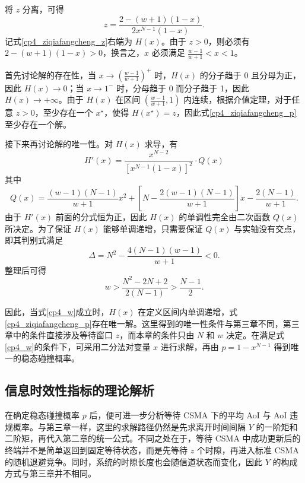 将 $z$ 分离，可得
\begin{equation}\label{cp4_ziqiafangcheng_z}
    z=\frac{2-(w+1)(1-x)}{2x^{N-1}(1-x)}.
\end{equation}
记式\eqref{cp4_ziqiafangcheng_z}右端为 $H(x)$。由于 $z>0$，则必须有 $2-(w+1)(1-x)>0$，换言之，$x$ 必须满足 $\frac{w-1}{w+1}<x<1$。

首先讨论解的存在性，当 $x\to \left(\frac{w-1}{w+1}\right)^+$ 时，$H(x)$ 的分子趋于 0 且分母为正，因此 $H(x)\to 0$；当 $x\to 1^-$ 时，分母趋于 0 而分子趋于 1，因此 $H(x)\to +\infty$。由于 $H(x)$ 在区间 $\left(\frac{w-1}{w+1},1\right)$ 内连续，根据介值定理，对于任意 $z>0$，至少存在一个 $x^\star$，使得 $H(x^\star)=z$，因此式\eqref{cp4_ziqiafangcheng_p}至少存在一个解。

接下来再讨论解的唯一性。对 $H(x)$ 求导，有
\begin{equation}
    H'(x) = \frac{x^{N-2}}{\left[x^{N-1}(1-x)\right]^2} \cdot Q(x)
\end{equation}
其中
\begin{equation}
    Q(x) = \frac{(w-1)(N-1)}{w+1}x^2 + \left[N - \frac{2(w-1)(N-1)}{w+1}\right]x - \frac{2(N-1)}{w+1}.
\end{equation}
由于 $H'(x)$ 前面的分式恒为正，因此 $H(x)$ 的单调性完全由二次函数 $Q(x)$ 所决定。为了保证 $H(x)$ 能够单调递增，只需要保证 $Q(x)$ 与实轴没有交点，即其判别式满足
\begin{equation}
    \Delta = N^2 - \frac{4(N-1)(w-1)}{w+1}<0.
\end{equation}
整理后可得
\begin{equation}\label{cp4_w}
    w>\frac{N^2-2N+2}{2(N-1)}>\frac{N-1}{2}.
\end{equation}

因此，当式\eqref{cp4_w}成立时，$H(x)$ 在定义区间内单调递增，式\eqref{cp4_ziqiafangcheng_p}存在唯一解。这里得到的唯一性条件与第三章不同，第三章中的条件直接涉及等待窗口 $z$，而本章的条件只由 $N$ 和 $w$ 决定。在满足式\eqref{cp4_w}的条件下，可采用二分法对变量 $x$ 进行求解，再由 $p=1-x^{N-1}$ 得到唯一的稳态碰撞概率。

\subsection{信息时效性指标的理论解析}

在确定稳态碰撞概率 $p$ 后，便可进一步分析等待 CSMA 下的平均 AoI 与 AoI 违规概率。与第三章一样，这里的求解路径仍然是先求离开时间间隔 $Y$ 的一阶矩和二阶矩，再代入第二章的统一公式。不同之处在于，等待 CSMA 中成功更新后的终端并不是简单返回到固定等待状态，而是先等待 $z$ 个时隙，再进入标准 CSMA 的随机退避竞争。同时，系统的时隙长度也会随信道状态而变化，因此 $Y$ 的构成方式与第三章并不相同。

